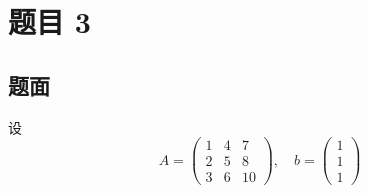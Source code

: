 \documentclass{article}
\begin{document}
\section{题目 3}

\subsection*{题面}

设
\[
  A =
  \begin{pmatrix}1&4&7\\2&5&8\\3&6&10
  \end{pmatrix}, \quad
  b =
  \begin{pmatrix}1\\1\\1
  \end{pmatrix}
\]
\end{document}
